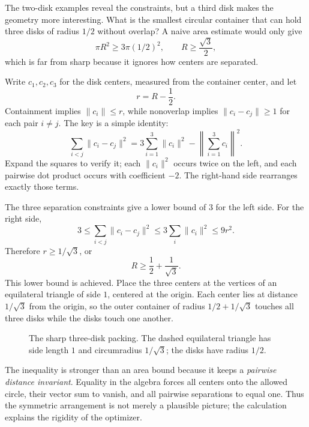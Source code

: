 The two-disk examples reveal the constraints, but a third disk makes the geometry more interesting. What is the smallest circular container that can hold three disks of radius $1/2$ without overlap? A naive area estimate would only give
\[
  \pi R^2\ge3\pi(1/2)^2,
  \qquad R\ge\frac{\sqrt3}{2},
\]
which is far from sharp because it ignores how centers are separated.

Write $c_1,c_2,c_3$ for the disk centers, measured from the container center, and let
\[
 r=R-\frac12.
\]
Containment implies $\|c_i\|\le r$, while nonoverlap implies $\|c_i-c_j\|\ge1$ for each pair $i\ne j$. The key is a simple identity:
\[
 \boxed{\sum_{i<j}\|c_i-c_j\|^2
 =3\sum_{i=1}^3\|c_i\|^2-
    \left\|\sum_{i=1}^3c_i\right\|^2.}
\]
Expand the squares to verify it; each $\|c_i\|^2$ occurs twice on the left, and each pairwise dot product occurs with coefficient $-2$. The right-hand side rearranges exactly those terms.

The three separation constraints give a lower bound of $3$ for the left side. For the right side,
\[
 3\le\sum_{i<j}\|c_i-c_j\|^2
 \le3\sum_i\|c_i\|^2
 \le9r^2.
\]
Therefore $r\ge1/\sqrt3$, or
\[
 \boxed{R\ge\frac12+\frac1{\sqrt3}.}
\]
This lower bound is achieved. Place the three centers at the vertices of an equilateral triangle of side $1$, centered at the origin. Each center lies at distance $1/\sqrt3$ from the origin, so the outer container of radius $1/2+1/\sqrt3$ touches all three disks while the disks touch one another.

\begin{figure}[H]
\centering
{}
\caption{The sharp three-disk packing. The dashed equilateral triangle has side length $1$ and circumradius $1/\sqrt3$; the disks have radius $1/2$.}
\end{figure}

The inequality is stronger than an area bound because it keeps a \emph{pairwise distance invariant}. Equality in the algebra forces all centers onto the allowed circle, their vector sum to vanish, and all pairwise separations to equal one. Thus the symmetric arrangement is not merely a plausible picture; the calculation explains the rigidity of the optimizer.


